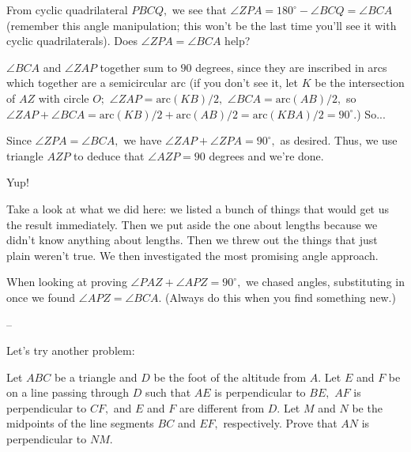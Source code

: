 From cyclic quadrilateral $PBCQ,$ we see that $\angle ZPA = 180^\circ - \angle BCQ = \angle BCA$ (remember this angle manipulation; this won't be the last time you'll see it with cyclic quadrilaterals). Does $\angle ZPA = \angle BCA$ help?


$\angle BCA$ and $\angle ZAP$ together sum to $90$ degrees, since they are inscribed in arcs which together are a semicircular arc (if you don't see it, let $K$ be the intersection of $AZ$ with circle $O;$ $\angle ZAP = \text{arc}(KB)/2,$ $\angle BCA = \text{arc}(AB)/2,$ so $\angle ZAP + \angle BCA = \text{arc}(KB)/2 + \text{arc}(AB)/2 = \text{arc}(KBA)/2 = 90^\circ.$)  So...


Since $\angle ZPA = \angle BCA,$ we have $\angle ZAP + \angle ZPA = 90^\circ,$ as desired. Thus, we use triangle $AZP$ to deduce that $\angle AZP = 90$ degrees and we're done.



Yup! 

Take a look at what we did here: we listed a bunch of things that would get us the result immediately. Then we put aside the one about lengths because we didn't know anything about lengths. Then we threw out the things that just plain weren't true. We then investigated the most promising angle approach.

When looking at proving $\angle PAZ + \angle APZ = 90^\circ,$ we chased angles, substituting in once we found $\angle APZ = \angle BCA. $ (Always do this when you find something new.)

--

Let's try another problem:

Let $ABC$ be a triangle and $D$ be the foot of the altitude from $A.$  Let $E$ and $F$ be on a line passing through $D$ such that $AE$ is perpendicular to $BE,$ $AF$ is perpendicular to $CF,$ and $E$ and $F$ are different from $D.$  Let $M$ and $N$ be the midpoints of the line segments $BC$ and $EF,$ respectively. Prove that $AN$ is perpendicular to $NM.$

